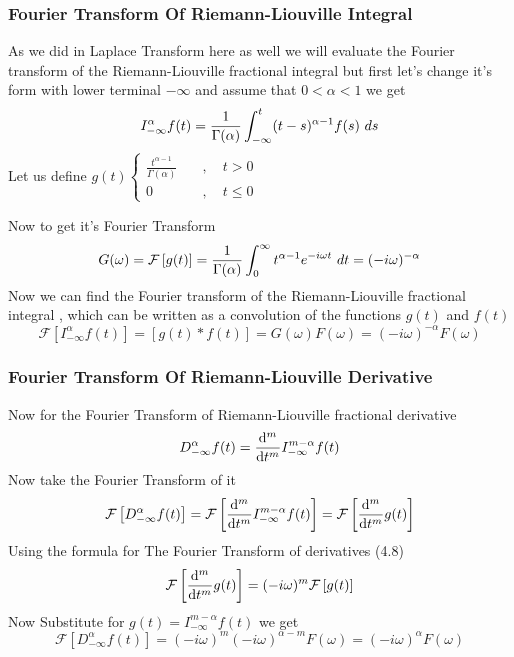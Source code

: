 \subsubsection{Fourier Transform Of Riemann-Liouville Integral}
As we did in Laplace Transform here as well 
we will evaluate the Fourier transform of the Riemann-Liouville fractional integral 
but first let's change it's form with lower terminal $-\infty$ and assume that $0<\alpha<1$ we get
\[
    I_{-\infty}^\alpha f(t) = \frac{1}{\Gamma(\alpha)}\int_{-\infty}^{t} (t-s)^{\alpha-1}f(s) \,\, ds
\]
Let us define 
\(
g(t) \begin{cases}
    \displaystyle \frac{t^{\alpha-1}}{\Gamma(\alpha)} \quad &,\quad t>0
    \\
    \displaystyle 0 \quad &,\quad   t \leq 0
\end{cases}
\)

Now to get it's Fourier Transform
\[
    G(\omega) = \mathcal{F}\left[ g(t) \right] = \frac{1}{\Gamma(\alpha)} \int_{0}^{\infty} t^{\alpha-1} e^{-i \omega t} \,\, dt= (-i\omega)^{-\alpha}
\]
Now we can find the Fourier transform of the Riemann-Liouville fractional integral , 
which can be written as a convolution of the functions $g(t)$ and $f(t)$
\[
    \mathcal{F}\left[ I_{-\infty}^\alpha f(t) \right] = \left[ g(t)*f(t) \right] = G(\omega)F(\omega) = (-i\omega)^{-\alpha} F(\omega)
\]
\subsubsection{Fourier Transform Of Riemann-Liouville Derivative}
Now for the Fourier Transform of Riemann-Liouville fractional derivative
\[
    D_{-\infty}^{\alpha} f(t) = \dv[m]{}{t} I_{-\infty}^{m-\alpha} f(t)
\]
Now take the Fourier Transform of it 
\[
    \mathcal{F}\left[ D_{-\infty}^{\alpha} f(t) \right]  = \mathcal{F}\left[ \dv[m]{}{t} I_{-\infty}^{m-\alpha} f(t) \right] = \mathcal{F}\left[ \dv[m]{}{t} g(t) \right]
\]
Using the formula for The Fourier Transform of derivatives (4.8)
\[
    \mathcal{F}\left[ \dv[m]{}{t} g(t) \right] = (-i\omega)^{m} \mathcal{F}\left[ g(t) \right]
\]
Now Substitute for $g(t) = I_{-\infty}^{m-\alpha} f(t)$ we get
\[
\mathcal{F}\left[ D_{-\infty}^{\alpha} f(t) \right] = (-i\omega)^{m} (-i\omega)^{\alpha-m} F(\omega) = (-i\omega)^{\alpha} F(\omega)
\]
